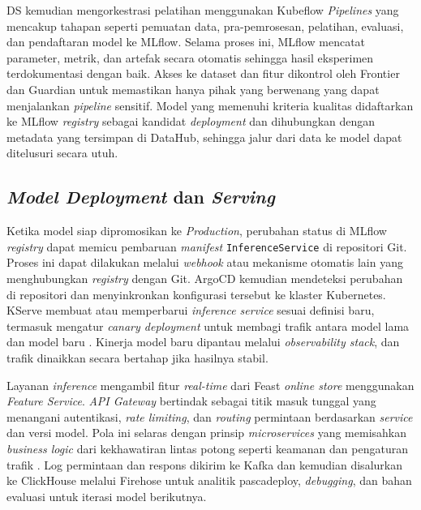 DS kemudian mengorkestrasi pelatihan menggunakan Kubeflow \textit{Pipelines} yang mencakup tahapan seperti pemuatan data, pra-pemrosesan, pelatihan, evaluasi, dan pendaftaran model ke MLflow. Selama proses ini, MLflow mencatat parameter, metrik, dan artefak secara otomatis sehingga hasil eksperimen terdokumentasi dengan baik. Akses ke dataset dan fitur dikontrol oleh Frontier dan Guardian untuk memastikan hanya pihak yang berwenang yang dapat menjalankan \textit{pipeline} sensitif. Model yang memenuhi kriteria kualitas didaftarkan ke MLflow \textit{registry} sebagai kandidat \textit{deployment} dan dihubungkan dengan metadata yang tersimpan di DataHub, sehingga jalur dari data ke model dapat ditelusuri secara utuh.

\subsection{\textit{Model Deployment} dan \textit{Serving}}

Ketika model siap dipromosikan ke \textit{Production}, perubahan status di MLflow \textit{registry} dapat memicu pembaruan \textit{manifest} \texttt{InferenceService} di repositori Git. Proses ini dapat dilakukan melalui \textit{webhook} atau mekanisme otomatis lain yang menghubungkan \textit{registry} dengan Git. ArgoCD kemudian mendeteksi perubahan di repositori dan menyinkronkan konfigurasi tersebut ke klaster Kubernetes. KServe membuat atau memperbarui \textit{inference service} sesuai definisi baru, termasuk mengatur \textit{canary deployment} untuk membagi trafik antara model lama dan model baru \autocite{fowler2014microservices,newman2015building}. Kinerja model baru dipantau melalui \textit{observability stack}, dan trafik dinaikkan secara bertahap jika hasilnya stabil.

Layanan \textit{inference} mengambil fitur \textit{real-time} dari Feast \textit{online store} menggunakan \textit{Feature Service}. \textit{API Gateway} bertindak sebagai titik masuk tunggal yang menangani autentikasi, \textit{rate limiting}, dan \textit{routing} permintaan berdasarkan \textit{service} dan versi model. Pola ini selaras dengan prinsip \textit{microservices} yang memisahkan \textit{business logic} dari kekhawatiran lintas potong seperti keamanan dan pengaturan trafik \autocite{fowler2014microservices,newman2015building}. Log permintaan dan respons dikirim ke Kafka dan kemudian disalurkan ke ClickHouse melalui Firehose untuk analitik pascadeploy, \textit{debugging}, dan bahan evaluasi untuk iterasi model berikutnya.

